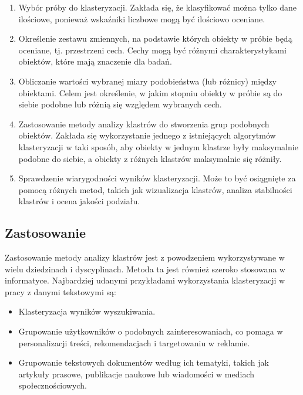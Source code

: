 			\begin{enumerate}
				\item Wybór próby do klasteryzacji. Zakłada się, że klasyfikować można tylko dane ilościowe, ponieważ wskaźniki liczbowe mogą być ilościowo oceniane.
				\item Określenie zestawu zmiennych, na podstawie których obiekty w próbie będą oceniane, tj. przestrzeni cech. Cechy mogą być różnymi charakterystykami obiektów, które mają znaczenie dla badań.
				\item Obliczanie wartości wybranej miary podobieństwa (lub różnicy) między obiektami. Celem jest określenie, w jakim stopniu obiekty w próbie są do siebie podobne lub różnią się względem wybranych cech.
				\item Zastosowanie metody analizy klastrów do stworzenia grup podobnych obiektów. Zakłada się wykorzystanie jednego z istniejących algorytmów klasteryzacji w taki sposób, aby obiekty w jednym klastrze były maksymalnie podobne do siebie, a obiekty z różnych klastrów maksymalnie się różniły.
				\item Sprawdzenie wiarygodności wyników klasteryzacji. Może to być osiągnięte za pomocą różnych metod, takich jak wizualizacja klastrów, analiza stabilności klastrów i ocena jakości podziału.
			\end{enumerate}

	\subsection{Zastosowanie}
		Zastosowanie metody analizy klastrów jest z powodzeniem wykorzystywane w wielu dziedzinach i dyscyplinach. Metoda ta jest również szeroko stosowana w informatyce. Najbardziej udanymi przykładami wykorzystania klasteryzacji w pracy z danymi tekstowymi są:
			
			\begin{itemize}
				\item Klasteryzacja wyników wyszukiwania.
				\item Grupowanie użytkowników o podobnych zainteresowaniach, co pomaga w personalizacji treści, rekomendacjach i targetowaniu w reklamie.
				\item Grupowanie tekstowych dokumentów według ich tematyki, takich jak artykuły prasowe, publikacje naukowe lub wiadomości w mediach społecznościowych.
			\end{itemize}

